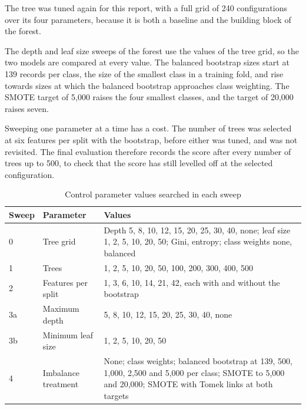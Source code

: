 \documentclass[conference,10pt]{IEEEtran}
\begin{document}
The tree was tuned again for this report, with a full grid of 240
configurations over its four parameters, because it is both a baseline and
the building block of the forest. 

The depth and leaf size sweeps of the forest use the values of the tree
grid, so the two models are compared at every value. The balanced
bootstrap sizes start at 139 records per class, the size of the smallest
class in a training fold, and rise towards sizes at which the balanced
bootstrap approaches class weighting. The SMOTE target of 5,000 raises the
four smallest classes, and the target of 20,000 raises seven.

Sweeping one parameter at a time has a cost. The number of trees was
selected at six features per split with the bootstrap, before either was
tuned, and was not revisited. The final evaluation therefore records the
score after every number of trees up to 500, to check that the score has
still levelled off at the selected configuration.

\begin{table}[t]
  \centering
  \caption{Control parameter values searched in each sweep}
  \label{tab:sweeps}
  \begin{tabular}{llp{4.2cm}}
    \toprule
    Sweep & Parameter & Values \\
    \midrule
    0  & Tree grid & Depth 5, 8, 10, 12, 15, 20, 25, 30, 40, none;
                     leaf size 1, 2, 5, 10, 20, 50; Gini, entropy;
                     class weights none, balanced \\
    1  & Trees & 1, 2, 5, 10, 20, 50, 100, 200, 300, 400, 500 \\
    2  & Features per split & 1, 3, 6, 10, 14, 21, 42, each with and
                              without the bootstrap \\
    3a & Maximum depth & 5, 8, 10, 12, 15, 20, 25, 30, 40, none \\
    3b & Minimum leaf size & 1, 2, 5, 10, 20, 50 \\
    4  & Imbalance treatment & None; class weights; balanced bootstrap at
                               139, 500, 1,000, 2,500 and 5,000 per class;
                               SMOTE to 5,000 and 20,000; SMOTE with Tomek
                               links at both targets \\
    \bottomrule
  \end{tabular}
\end{table}
\end{document}

